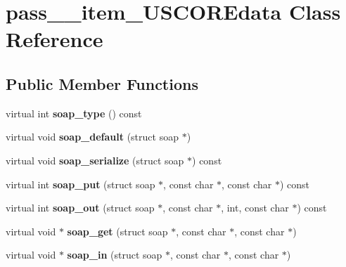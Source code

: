 \hypertarget{classpass____item__USCOREdata}{
\section{pass\_\-\_\-item\_\-USCOREdata Class Reference}
\label{classpass____item__USCOREdata}
}
\subsection*{Public Member Functions}
\begin{DoxyCompactItemize}
\item 
\hypertarget{classpass____item__USCOREdata_a12c50048b6200f6c4f259d6262a52fac}{
virtual int {\bfseries soap\_\-type} () const }
\label{classpass____item__USCOREdata_a12c50048b6200f6c4f259d6262a52fac}

\item 
\hypertarget{classpass____item__USCOREdata_a1754494133ab7de88f484f917f2218dd}{
virtual void {\bfseries soap\_\-default} (struct soap $\ast$)}
\label{classpass____item__USCOREdata_a1754494133ab7de88f484f917f2218dd}

\item 
\hypertarget{classpass____item__USCOREdata_a8497c7525e14769035d03f2ab24243dd}{
virtual void {\bfseries soap\_\-serialize} (struct soap $\ast$) const }
\label{classpass____item__USCOREdata_a8497c7525e14769035d03f2ab24243dd}

\item 
\hypertarget{classpass____item__USCOREdata_a865615b4a362b87435156aa9b8df0c29}{
virtual int {\bfseries soap\_\-put} (struct soap $\ast$, const char $\ast$, const char $\ast$) const }
\label{classpass____item__USCOREdata_a865615b4a362b87435156aa9b8df0c29}

\item 
\hypertarget{classpass____item__USCOREdata_af336cadcd60e4a814c57e3787f1967f6}{
virtual int {\bfseries soap\_\-out} (struct soap $\ast$, const char $\ast$, int, const char $\ast$) const }
\label{classpass____item__USCOREdata_af336cadcd60e4a814c57e3787f1967f6}

\item 
\hypertarget{classpass____item__USCOREdata_a2aeee4b9fd4661c724107d2597ad3da6}{
virtual void $\ast$ {\bfseries soap\_\-get} (struct soap $\ast$, const char $\ast$, const char $\ast$)}
\label{classpass____item__USCOREdata_a2aeee4b9fd4661c724107d2597ad3da6}

\item 
\hypertarget{classpass____item__USCOREdata_ac6d1f8aa6d25224815f1c2761de7d41e}{
virtual void $\ast$ {\bfseries soap\_\-in} (struct soap $\ast$, const char $\ast$, const char $\ast$)}
\label{classpass____item__USCOREdata_ac6d1f8aa6d25224815f1c2761de7d41e}

\end{DoxyCompactItemize}
